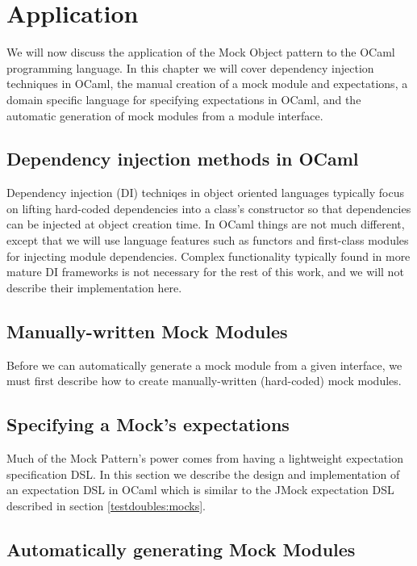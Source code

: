 \chapter{Application}
\label{application}

We will now discuss the application of the Mock Object pattern to the
OCaml programming language. In this chapter we will cover dependency
injection techniques in OCaml, the manual creation of a mock module
and expectations, a domain specific language for specifying
expectations in OCaml, and the automatic generation of mock modules
from a module interface.

\section{Dependency injection methods in OCaml}
\label{application:di}

Dependency injection (DI) techniqes in object oriented languages
typically focus on lifting hard-coded dependencies into a class's
constructor so that dependencies can be injected at object creation
time. In OCaml things are not much different, except that we will use
language features such as functors and first-class modules for
injecting module dependencies. Complex functionality typically found
in more mature DI frameworks is not necessary for the rest of this
work, and we will not describe their implementation here.

\section{Manually-written Mock Modules}
\label{application:manual-mock}

Before we can automatically generate a mock module from a given
interface, we must first describe how to create manually-written
(hard-coded) mock modules.

\section{Specifying a Mock's expectations}
\label{application:expectations}

Much of the Mock Pattern's power comes from having a lightweight
expectation specification DSL. In this section we describe the design
and implementation of an expectation DSL in OCaml which is similar to
the JMock expectation DSL described in section
\ref{testdoubles:mocks}.

\section{Automatically generating Mock Modules}
\label{application:generation}

